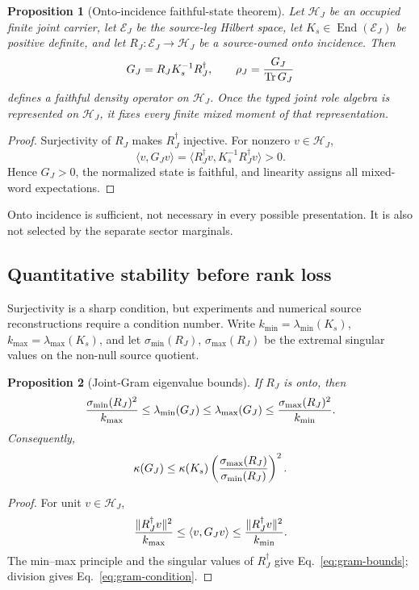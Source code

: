 \documentclass[11pt]{article}
\newtheorem{proposition}{Proposition}
\newcommand{\Tr}{\operatorname{Tr}}
\newcommand{\End}{\operatorname{End}}
\begin{document}
\begin{proposition}[Onto-incidence faithful-state theorem]
Let \(\mathcal H_J\) be an occupied finite joint carrier, let
\(\mathcal E_J\) be the source-leg Hilbert space, let
\(K_s\in\End(\mathcal E_J)\) be positive definite, and let
\(R_J:\mathcal E_J\to\mathcal H_J\) be a source-owned onto incidence.  Then
\begin{equation}
 G_J=R_JK_s^{-1}R_J^\dagger,
 \qquad
 \rho_J={G_J\over\Tr G_J}
 \label{eq:joint-gram-state}
\end{equation}
defines a faithful density operator on \(\mathcal H_J\).  Once the typed joint
role algebra is represented on \(\mathcal H_J\), it fixes every finite mixed
moment of that representation.
\end{proposition}
\begin{proof}
Surjectivity of \(R_J\) makes \(R_J^\dagger\) injective.  For nonzero
\(v\in\mathcal H_J\),
\begin{equation}
 \langle v,G_Jv\rangle
 =\langle R_J^\dagger v,K_s^{-1}R_J^\dagger v\rangle>0.
\end{equation}
Hence \(G_J>0\), the normalized state is faithful, and linearity assigns all
mixed-word expectations.
\end{proof}

Onto incidence is sufficient, not necessary in every possible presentation.
It is also not selected by the separate sector marginals.

\subsection{Quantitative stability before rank loss}

Surjectivity is a sharp condition, but experiments and numerical source
reconstructions require a condition number.  Write
\(k_{\min}=\lambda_{\min}(K_s)\),
\(k_{\max}=\lambda_{\max}(K_s)\), and let
\(\sigma_{\min}(R_J)\), \(\sigma_{\max}(R_J)\) be the extremal singular values
on the non-null source quotient.

\begin{proposition}[Joint-Gram eigenvalue bounds]
If \(R_J\) is onto, then
\begin{equation}
 {\sigma_{\min}(R_J)^2\over k_{\max}}
 \le \lambda_{\min}(G_J)
 \le \lambda_{\max}(G_J)
 \le {\sigma_{\max}(R_J)^2\over k_{\min}}.
 \label{eq:gram-bounds}
\end{equation}
Consequently,
\begin{equation}
 \kappa(G_J)\le
 \kappa(K_s)\left({\sigma_{\max}(R_J)\over
 \sigma_{\min}(R_J)}\right)^2.
 \label{eq:gram-condition}
\end{equation}
\end{proposition}
\begin{proof}
For unit \(v\in\mathcal H_J\),
\begin{equation}
 {\lVert R_J^\dagger v\rVert^2\over k_{\max}}
 \le \langle v,G_Jv\rangle
 \le {\lVert R_J^\dagger v\rVert^2\over k_{\min}}.
\end{equation}
The min--max principle and the singular values of \(R_J^\dagger\) give
Eq.~\eqref{eq:gram-bounds}; division gives
Eq.~\eqref{eq:gram-condition}.
\end{proof}
\end{document}
